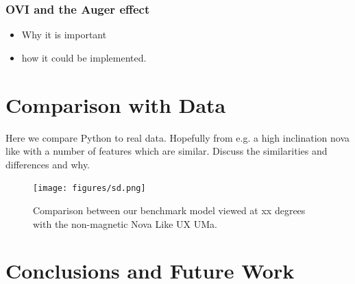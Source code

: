 \documentclass[preprint, a4paper, 11pt]{aastex}
\begin{document}
\subsubsection{OVI and the Auger effect}
\begin{itemize}
\item Why it is important
\item how it could be implemented.
\end{itemize}



\newpage

%
%

\section{Comparison with Data}

Here we compare Python to real data. Hopefully from e.g. a high inclination 
nova like with a number of features which are similar. Discuss the 
similarities and differences and why.

\begin{figure}[!h]
\texttt{[image: figures/sd.png]}
\caption{Comparison between our benchmark model viewed at xx degrees with the 
non-magnetic Nova Like UX UMa.}
\end{figure}





\newpage
%
%


\section{Conclusions and Future Work}

\end{document}
